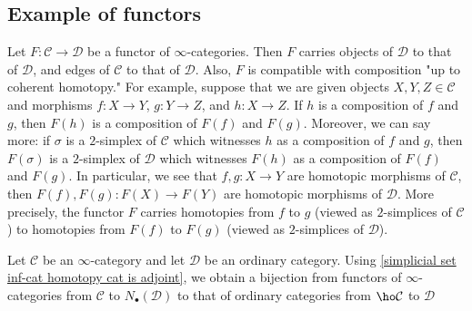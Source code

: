 \subsection{Example of functors}
Let $F:\mathcal{C}\to\mathcal{D}$ be a functor of $\infty$-categories. Then $F$ carries objects of $\mathcal{D}$ to that of $\mathcal{D}$, and edges of $\mathcal{C}$ to that of $\mathcal{D}$. Also, $F$ is compatible with composition "up to coherent homotopy." For example, suppose that we are given objects $X,Y,Z\in\mathcal{C}$ and morphisms $f:X\to Y$, $g:Y\to Z$, and $h:X\to Z$. If $h$ is a composition of $f$ and $g$, then $F(h)$ is a composition of $F(f)$ and $F(g)$. Moreover, we can say more: if $\sigma$ is a $2$-simplex of $\mathcal{C}$ which witnesses $h$ as a composition of $f$ and $g$, then $F(\sigma)$ is a $2$-simplex of $\mathcal{D}$ which witnesses $F(h)$ as a composition of $F(f)$ and $F(g)$. In particular, we see that $f,g:X\to Y$ are homotopic morphisms of $\mathcal{C}$, then $F(f),F(g):F(X)\to F(Y)$ are homotopic morphisms of $\mathcal{D}$. More precisely, the functor $F$ carries homotopies from $f$ to $g$ (viewed as $2$-simplices of $\mathcal{C}$) to homotopies from $F(f)$ to $F(g)$ (viewed as $2$-simplices of $\mathcal{D}$).
\begin{example}
Let $\mathcal{C}$ be an $\infty$-category and let $\mathcal{D}$ be an ordinary category. Using \cref{simplicial set inf-cat homotopy cat is adjoint}, we obtain a bijection from functors of $\infty$-categories from $\mathcal{C}$ to $N_\bullet(\mathcal{D})$ to that of ordinary categories from $\ho\mathcal{C}$ to $\mathcal{D}$
\end{example}
